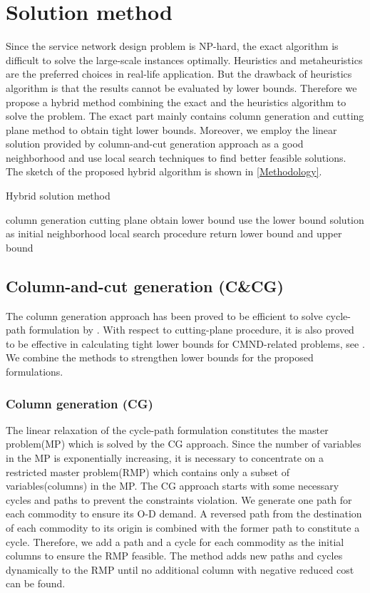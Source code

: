 \documentclass[11pt,nonblindrev,fleqn]{article}
\begin{document}
\section{Solution method}\label{method}
Since the service network design problem is NP-hard, the exact algorithm is difficult to solve the large-scale instances optimally. Heuristics and metaheuristics are the preferred choices in real-life application. But the drawback of heuristics algorithm is that the results cannot be evaluated by lower bounds. Therefore we propose a hybrid method combining the exact and the heuristics algorithm to solve the problem. The exact part mainly contains column generation and cutting plane method to obtain tight lower bounds. Moreover, we employ the linear solution provided by column-and-cut generation approach as a good neighborhood and use local search techniques to find better feasible solutions. The sketch of the proposed hybrid algorithm is shown in \autoref{Methodology}.

\vspace{.15in}
\begin{algorithm}[H]
\caption{Hybrid solution method}\label{Methodology}
\LinesNumbered
\SetNlSkip{1.2em}
{
    column generation\;
    cutting plane\;
}
obtain lower bound\;
use the lower bound solution as initial neighborhood\;
local search procedure\;
return lower bound and upper bound\;
\end{algorithm}
\subsection{Column-and-cut generation (C\&CG)}
The column generation approach has been proved to be efficient to solve cycle-path formulation by \cite{Andersen2011Branch}. With respect to cutting-plane procedure, it is also proved to be effective in calculating tight lower bounds for CMND-related problems, see \cite{Chouman2009Commodity,Chouman2016Commodity,Chouman2015Cutting}. We combine the methods to strengthen lower bounds for the proposed formulations.

\subsubsection{Column generation (CG)}
The linear relaxation of the cycle-path formulation constitutes the master problem(MP) which is solved by the CG approach. Since the number of variables in the MP is exponentially increasing, it is necessary to concentrate on a restricted master problem(RMP) which contains only a subset of variables(columns) in the MP.  The CG approach starts with some necessary cycles and paths to prevent the constraints violation. We generate one path for each commodity to ensure its O-D demand. A reversed path from the destination of each commodity to its origin is combined with the former path to constitute a cycle. Therefore, we add a path and a cycle for each commodity as the initial columns to ensure the RMP feasible. The method adds new paths and cycles dynamically to the RMP until no additional column with negative reduced cost can be found.
\end{document}
